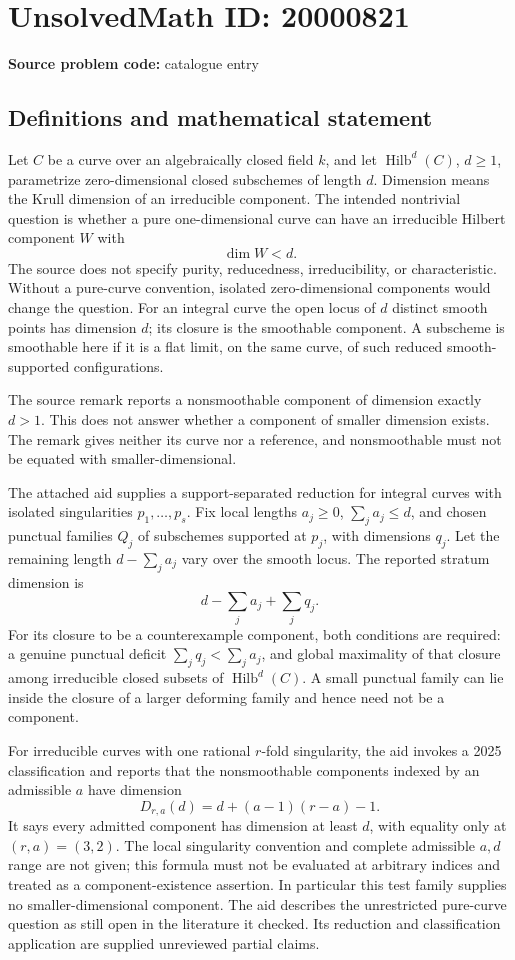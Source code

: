 \documentclass[11pt]{article}
\begin{document}
\section*{UnsolvedMath ID: 20000821}
\textbf{Source problem code:} catalogue entry
\subsection{Definitions and mathematical statement}
Let \(C\) be a curve over an algebraically closed field \(k\), and let \(\operatorname{Hilb}^d(C)\), \(d\geq1\), parametrize zero-dimensional closed subschemes of length \(d\). Dimension means the Krull dimension of an irreducible component. The intended nontrivial question is whether a pure one-dimensional curve can have an irreducible Hilbert component \(W\) with
\[
\dim W<d.
\]
The source does not specify purity, reducedness, irreducibility, or characteristic. Without a pure-curve convention, isolated zero-dimensional components would change the question. For an integral curve the open locus of \(d\) distinct smooth points has dimension \(d\); its closure is the smoothable component. A subscheme is smoothable here if it is a flat limit, on the same curve, of such reduced smooth-supported configurations.

The source remark reports a nonsmoothable component of dimension exactly \(d>1\). This does not answer whether a component of smaller dimension exists. The remark gives neither its curve nor a reference, and nonsmoothable must not be equated with smaller-dimensional.

The attached aid supplies a support-separated reduction for integral curves with isolated singularities \(p_1,\ldots,p_s\). Fix local lengths \(a_j\geq0\), \(\sum_j a_j\leq d\), and chosen punctual families \(Q_j\) of subschemes supported at \(p_j\), with dimensions \(q_j\). Let the remaining length \(d-\sum_j a_j\) vary over the smooth locus. The reported stratum dimension is
\[
d-\sum_j a_j+\sum_j q_j.
\]
For its closure to be a counterexample component, both conditions are required: a genuine punctual deficit \(\sum_jq_j<\sum_ja_j\), and global maximality of that closure among irreducible closed subsets of \(\operatorname{Hilb}^d(C)\). A small punctual family can lie inside the closure of a larger deforming family and hence need not be a component.

For irreducible curves with one rational \(r\)-fold singularity, the aid invokes a 2025 classification and reports that the nonsmoothable components indexed by an admissible \(a\) have dimension
\[
D_{r,a}(d)=d+(a-1)(r-a)-1.
\]
It says every admitted component has dimension at least \(d\), with equality only at \((r,a)=(3,2)\). The local singularity convention and complete admissible \(a,d\) range are not given; this formula must not be evaluated at arbitrary indices and treated as a component-existence assertion. In particular this test family supplies no smaller-dimensional component. The aid describes the unrestricted pure-curve question as still open in the literature it checked. Its reduction and classification application are supplied unreviewed partial claims.
\end{document}
